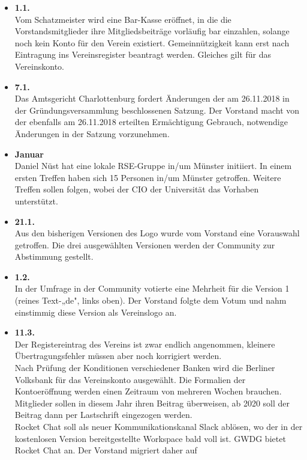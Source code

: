 \begin{itemize}
 \item \textbf{1.1.}\\
  Vom Schatzmeister wird eine Bar-Kasse eröffnet, in die die
  Vorstandsmitglieder ihre Mitgliedsbeiträge vorläufig bar einzahlen,
  solange noch kein Konto für den Verein existiert.
  Gemeinnützigkeit kann erst nach Eintragung ins Vereinsregister beantragt
  werden. Gleiches gilt für das Vereinskonto.
 \item \textbf{7.1.}\\
  Das Amtsgericht Charlottenburg fordert Änderungen der am 26.11.2018 in der
  Gründungsversammlung beschlossenen Satzung. Der
  Vorstand macht von der ebenfalls am 26.11.2018 erteilten Ermächtigung
  Gebrauch, notwendige Änderungen in der Satzung vorzunehmen.
 \item \textbf{Januar}\\
  Daniel Nüst hat eine lokale RSE-Gruppe in/um Münster initiiert. In einem ersten
  Treffen haben sich 15 Personen in/um Münster getroffen. Weitere
  Treffen sollen folgen, wobei der CIO der Universität das Vorhaben
  unterstützt.
 \item \textbf{21.1.}\\
  Aus den bisherigen Versionen des Logo wurde vom Vorstand eine Vorauswahl
  getroffen. Die drei ausgewählten Versionen werden der Community zur
  Abstimmung gestellt.
 \item \textbf{1.2.}\\
  In der Umfrage in der Community votierte eine Mehrheit
  für die Version 1 (reines Text-„de", links oben). Der Vorstand folgte
  dem Votum und nahm einstimmig diese Version als Vereinslogo an.
 \item \textbf{11.3.}\\
  Der Registereintrag des Vereins ist zwar endlich angenommen, kleinere Übertragungsfehler
  müssen aber noch korrigiert werden.\\
  Nach Prüfung der Konditionen verschiedener Banken wird die Berliner
  Volksbank für das Vereinskonto ausgewählt. Die Formalien der Kontoeröffnung werden
  einen Zeitraum von mehreren Wochen brauchen.\\
  Mitglieder sollen in diesem Jahr ihren Beitrag überweisen, ab 2020 soll
  der Beitrag dann per Lastschrift eingezogen werden.\\
  Rocket Chat soll als neuer Kommunikationskanal Slack ablösen, wo der in
  der kostenlosen Version bereitgestellte Workspace bald voll ist. GWDG
  bietet Rocket Chat an. Der Vorstand migriert daher auf\\

\end{itemize}
